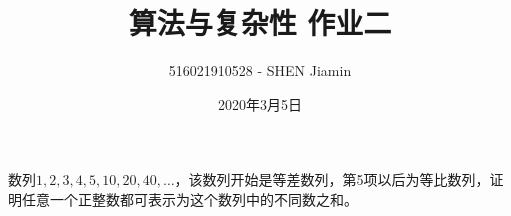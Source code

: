 \documentclass[answers]{exam}
\title{算法与复杂性 \quad 作业二}
\author{516021910528 - SHEN Jiamin}
\date{2020年3月5日}
\begin{document}
\maketitle

\begin{questions}

    \question 数列$1,2,3,4,5,10,20,40,\dots$，该数列开始是等差数列，第5项以后为等比数列，证明任意一个正整数都可表示为这个数列中的不同数之和。

    \begin{solution}
\end{solution}
\end{questions}
\end{document}
